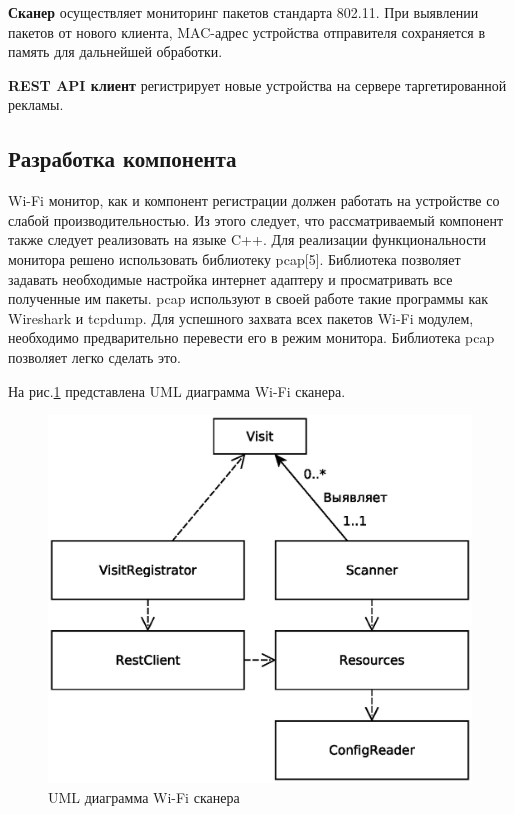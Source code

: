 \textbf{Сканер} осуществляет мониторинг пакетов стандарта 802.11. При выявлении пакетов от нового клиента, MAC-адрес устройства отправителя сохраняется в память для дальнейшей обработки.

\textbf{REST API клиент} регистрирует новые устройства на сервере таргетированной рекламы.

\subsection{Разработка компонента}

Wi-Fi монитор, как и компонент регистрации должен работать на устройстве со слабой производительностью. Из этого следует, что рассматриваемый компонент также следует реализовать на языке C++. Для реализации функциональности монитора решено использовать библиотеку pcap[5]. Библиотека позволяет задавать необходимые настройка интернет адаптеру и просматривать все полученные им пакеты. pcap используют в своей работе такие программы как Wireshark и tcpdump. Для успешного захвата всех пакетов Wi-Fi модулем, необходимо предварительно перевести его в режим монитора. Библиотека pcap позволяет легко сделать это.

На рис.\ref{fig:WiFiScanerUML} представлена UML диаграмма Wi-Fi сканера.

\begin{figure}[H]
	\centering
	\includegraphics[width=\linewidth]{fig/WiFiScanerUML}
	\caption{UML диаграмма Wi-Fi сканера}
	\label{fig:WiFiScanerUML}
\end{figure}

